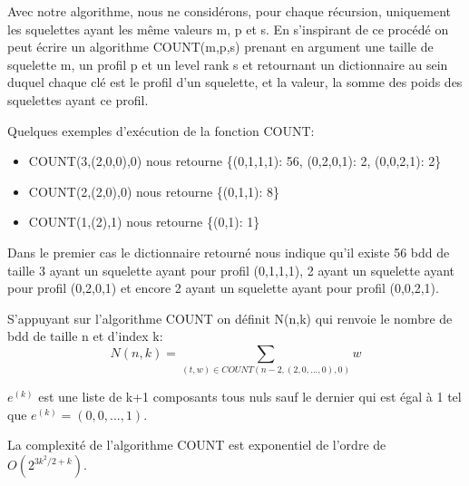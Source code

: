 \documentclass[french]{article}
\begin{document}
Avec notre algorithme, nous ne considérons, pour chaque récursion, uniquement les squelettes ayant les même valeurs m, p et s. 
En s'inspirant de ce procédé on peut écrire un algorithme COUNT(m,p,s) prenant en argument une taille de squelette m, un profil p et un level rank s et retournant un dictionnaire au sein duquel chaque clé est le profil d'un squelette, et la valeur, la somme des poids des squelettes ayant ce profil. 

Quelques exemples d'exécution de la fonction COUNT:
\begin{itemize}
    \item COUNT(3,(2,0,0),0) nous retourne \{(0,1,1,1): 56, (0,2,0,1): 2, (0,0,2,1): 2\}
    \item COUNT(2,(2,0),0) nous retourne  \{(0,1,1): 8\}
    \item COUNT(1,(2),1) nous retourne \{(0,1): 1\}
\end{itemize}

Dans le premier cas le dictionnaire retourné nous indique qu'il existe 56 bdd de taille 3 ayant un squelette ayant pour profil (0,1,1,1), 2 ayant un squelette ayant pour profil (0,2,0,1) et encore 2 ayant un squelette ayant pour profil (0,0,2,1).


S'appuyant sur l'algorithme COUNT on définit N(n,k) qui renvoie le nombre de bdd de taille n et d'index k:
\[N(n,k)=\underset{(t,w)\in COUNT(n-2,(2,0,...,0),0)}{\sum} w\]

\(e^{(k)}\) est une liste de k+1 composants tous nuls sauf le dernier qui est égal à 1 tel que \(e^{(k)} = (0,0,...,1)\).

La complexité de l'algorithme COUNT est exponentiel de l'ordre de \(O(2^{3k^2/2+k})\).
\end{document}
